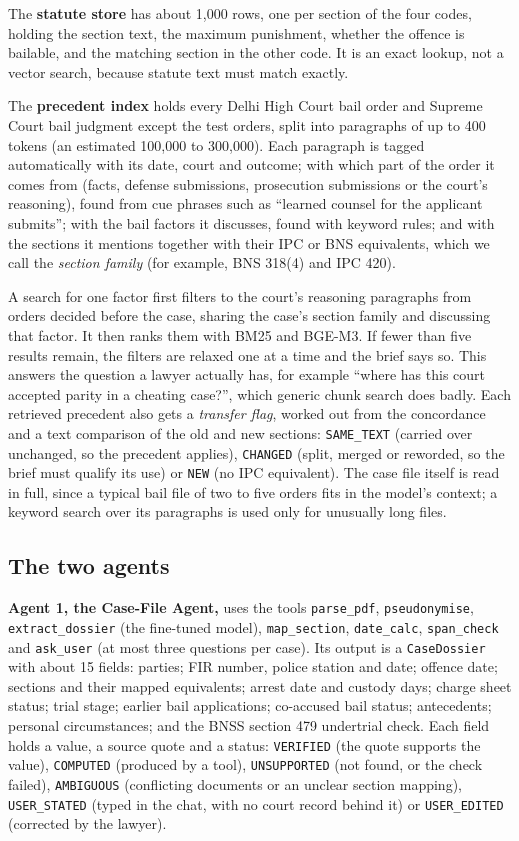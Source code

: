\documentclass[11pt,a4paper]{article}
\newcommand{\st}[1]{\texttt{\small #1}}
\begin{document}
The \textbf{statute store} has about 1,000 rows, one per section of the four codes, holding the section text, the maximum punishment, whether the offence is bailable, and the matching section in the other code. It is an exact lookup, not a vector search, because statute text must match exactly.

The \textbf{precedent index} holds every Delhi High Court bail order and Supreme Court bail judgment except the test orders, split into paragraphs of up to 400 tokens (an estimated 100,000 to 300,000). Each paragraph is tagged automatically with its date, court and outcome; with which part of the order it comes from (facts, defense submissions, prosecution submissions or the court's reasoning), found from cue phrases such as ``learned counsel for the applicant submits''; with the bail factors it discusses, found with keyword rules; and with the sections it mentions together with their IPC or BNS equivalents, which we call the \emph{section family} (for example, BNS 318(4) and IPC 420).

A search for one factor first filters to the court's reasoning paragraphs from orders decided before the case, sharing the case's section family and discussing that factor. It then ranks them with BM25 and BGE-M3. If fewer than five results remain, the filters are relaxed one at a time and the brief says so. This answers the question a lawyer actually has, for example ``where has this court accepted parity in a cheating case?'', which generic chunk search does badly. Each retrieved precedent also gets a \emph{transfer flag}, worked out from the concordance and a text comparison of the old and new sections: \st{SAME\_TEXT} (carried over unchanged, so the precedent applies), \st{CHANGED} (split, merged or reworded, so the brief must qualify its use) or \st{NEW} (no IPC equivalent). The case file itself is read in full, since a typical bail file of two to five orders fits in the model's context; a keyword search over its paragraphs is used only for unusually long files.

\subsection{The two agents}

\textbf{Agent 1, the Case-File Agent,} uses the tools \st{parse\_pdf}, \st{pseudonymise}, \st{extract\_dossier} (the fine-tuned model), \st{map\_section}, \st{date\_calc}, \st{span\_check} and \st{ask\_user} (at most three questions per case). Its output is a \st{CaseDossier} with about 15 fields: parties; FIR number, police station and date; offence date; sections and their mapped equivalents; arrest date and custody days; charge sheet status; trial stage; earlier bail applications; co-accused bail status; antecedents; personal circumstances; and the BNSS section 479 undertrial check. Each field holds a value, a source quote and a status: \st{VERIFIED} (the quote supports the value), \st{COMPUTED} (produced by a tool), \st{UNSUPPORTED} (not found, or the check failed), \st{AMBIGUOUS} (conflicting documents or an unclear section mapping), \st{USER\_STATED} (typed in the chat, with no court record behind it) or \st{USER\_EDITED} (corrected by the lawyer).
\end{document}
